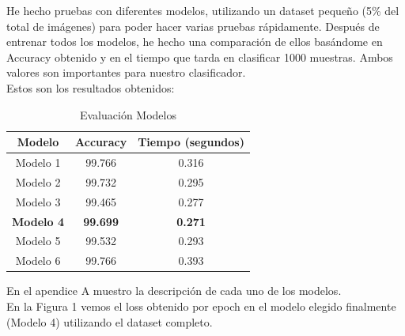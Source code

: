 \documentclass[a4paper, 11pt]{article}
\begin{document}
			He hecho pruebas con diferentes modelos\cite{compare-models}, utilizando un dataset pequeño (5\% del total de imágenes) para poder hacer varias pruebas rápidamente. Después de entrenar todos los modelos, he hecho una comparación de ellos basándome en Accuracy obtenido y en el tiempo que tarda en clasificar 1000 muestras. Ambos valores son importantes para nuestro clasificador. \\
			
			Estos son los resultados obtenidos:
			
			\begin{table}[htb!]
				\centering
				\caption{Evaluación Modelos}
				\label{evaluacion-modelos}
				\begin{tabular}{|c|c|c|}
					\hline
					\textbf{Modelo}                                                 & \textbf{Accuracy} & \textbf{Tiempo (segundos)} \\ \hline
					Modelo 1                                                            & 99.766                & 0.316               \\ \hline
					Modelo 2                                                              & 99.732                & 0.295              \\ \hline
					Modelo 3                                                   & 99.465                & 0.277                \\ \hline
					\textbf{Modelo 4}                                                    & \textbf{99.699}             & \textbf{0.271}               \\ \hline
					Modelo 5                                                    & 99.532             & 0.293               \\ \hline
					Modelo 6                                                    & 99.766             & 0.393               \\ \hline
				\end{tabular}
			\end{table}
			
			En el apendice A muestro la descripción de cada uno de los modelos. \\
			
			En la Figura 1 vemos el loss obtenido por epoch en el modelo elegido finalmente (Modelo 4) utilizando el dataset completo.
			
\end{document}
